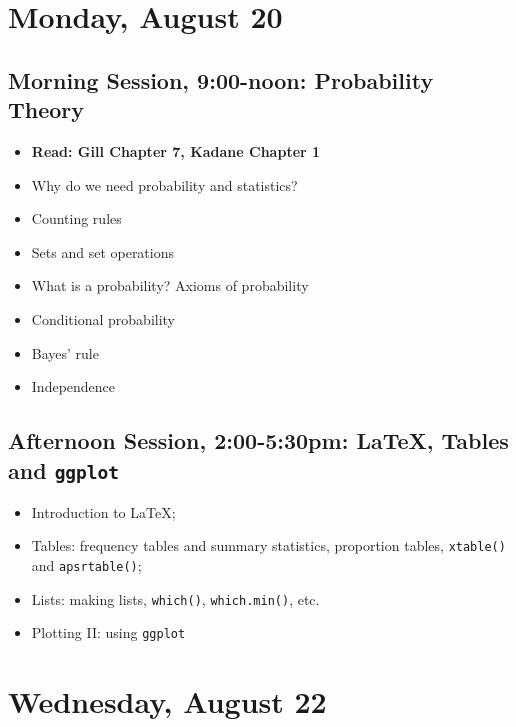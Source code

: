 \documentclass[12pt,a4paper]{article}
\begin{document}
\section*{Monday, August 20}

\subsection*{Morning Session, 9:00-noon: Probability Theory}
\begin{itemize}
\setlength{\itemsep}{0pt}
\footnotesize
\item \textbf{Read: Gill Chapter 7, Kadane Chapter 1}
\item Why do we need probability and statistics?
\item Counting rules
\item Sets and set operations
\item What is a probability? Axioms of probability
\item Conditional probability
\item Bayes' rule
\item Independence

\end{itemize}


\subsection*{Afternoon Session, 2:00-5:30pm: \LaTeX, Tables and \texttt{ggplot}}
\begin{itemize}
\setlength{\itemsep}{0pt}
\footnotesize
\item Introduction to \LaTeX;
\item Tables: frequency tables and summary statistics, proportion tables, \texttt{xtable()} and \texttt{apsrtable()};
\item Lists: making lists, \texttt{which()}, \texttt{which.min()}, etc.
\item Plotting II: using \texttt{ggplot}
\end{itemize}

\section*{Wednesday, August 22}
\end{document}
